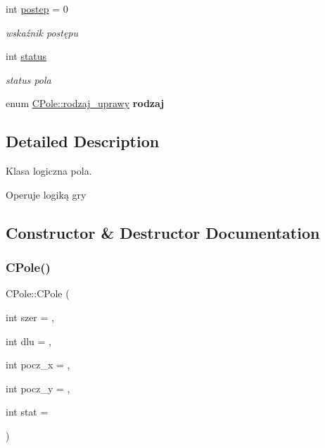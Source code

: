 \begin{DoxyCompactItemize}
int \mbox{\hyperlink{class_c_pole_a6bdbbef0f210d916197c81af56f71ef6}{postep}} = 0
\begin{DoxyCompactList}\small\item\em wskaźnik postępu \end{DoxyCompactList}\item 
\mbox{\label{class_c_pole_abbe82aa50aab4af383b0009924f9b7ef}} 
int \mbox{\hyperlink{class_c_pole_abbe82aa50aab4af383b0009924f9b7ef}{status}}
\begin{DoxyCompactList}\small\item\em status pola \end{DoxyCompactList}\item 
\mbox{\label{class_c_pole_a7ce2e4b14eb9a628dd163978999954e5}} 
enum \mbox{\hyperlink{class_c_pole_ae1a4d6f49c1d06a7bd4b1a2a7a1223fa}{C\+Pole\+::rodzaj\+\_\+uprawy}} {\bfseries rodzaj}
\end{DoxyCompactItemize}


\subsection{Detailed Description}
Klasa logiczna pola. 

Operuje logiką gry 

\subsection{Constructor \& Destructor Documentation}
\mbox{\label{class_c_pole_a34ef39ce57a6af1443cfffbaf19f2436}} 
\subsubsection{\texorpdfstring{C\+Pole()}{CPole()}}
{\footnotesize\ttfamily C\+Pole\+::\+C\+Pole (\begin{DoxyParamCaption}\item[{int}]{szer = {},  }\item[{int}]{dlu = {},  }\item[{int}]{pocz\+\_\+x = {},  }\item[{int}]{pocz\+\_\+y = {},  }\item[{int}]{stat = {} }\end{DoxyParamCaption})}



